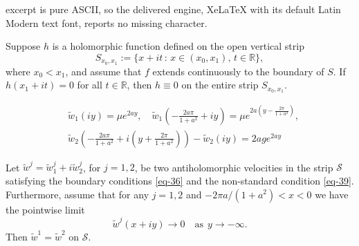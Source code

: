 \documentclass[10pt,a4paper]{amsart}
\def\R{\mathbb{R}}
\def\SS{\mathcal{S}}
\begin{document}
excerpt is pure ASCII, so the delivered engine, XeLaTeX with its default Latin Modern text font, reports no missing character.
\begin{prop}\label{holojedno}
Suppose $h$ is a holomorphic function defined on the open vertical strip
\[
S_{x_{0},x_{1}} := \{x + it \,:\, x \in (x_0, x_1), \, t \in \R\},
\]
where $x_0 < x_1$, and assume that $f$ extends continuously to the boundary of $S$. If $h(x_1 + it) = 0$ for all $t \in \R$, then $h \equiv 0$ on the entire strip $S_{x_{0},x_{1}}$.
\end{prop}

\begin{align}\label{eq-36}
& \tilde{w}_{1}(iy) = \mu e^{2ay}, \quad \tilde{w}_{1}\left(-\frac{2a\pi}{1+a^2} + iy\right) = \mu e^{2a(y - \frac{2\pi}{1+a^2})}, \\ \label{eq-39}
& \tilde{w}_{2}\left(-\frac{2a\pi}{1+a^2} + i\left(y + \frac{2\pi}{1+a^2}\right)\right) - \tilde{w}_{2}(iy) = 2ag e^{2ay}
\end{align}

\begin{prop}\label{tresc}
Let $\tilde{w}^j = \tilde{w}^{j}_{1}+i\tilde{w}^{j}_{2}$, for $j = 1, 2$, be two antiholomorphic velocities in the strip $\SS$ satisfying the boundary conditions \eqref{eq-36} and the non-standard condition \eqref{eq-39}. Furthermore, assume that for any $j=1,2$ and $-2\pi a/(1+a^2)<x<0$ we have the pointwise limit
\begin{equation}\label{obietnica}
\tilde{w}^j(x+iy)\rightarrow 0\quad \text{as} \ \ y\to -\infty.
\end{equation}
Then $\tilde{w}^1 = \tilde{w}^2$ on $\SS$.
\end{prop}
\end{document}
